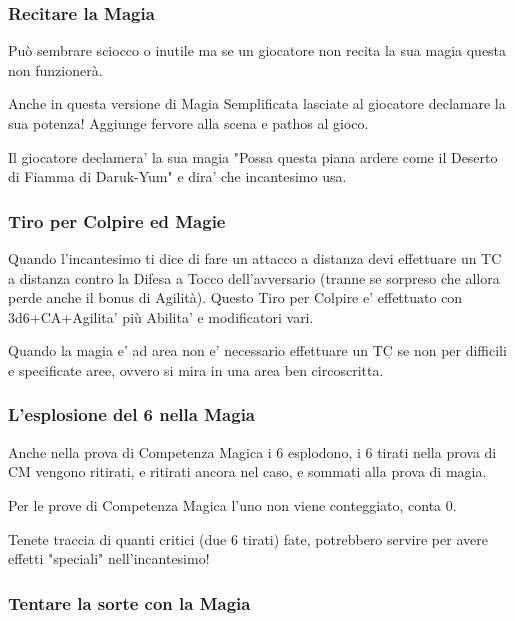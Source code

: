 \begin{multicols}{2}
\subsubsection{Recitare la Magia}

Può sembrare sciocco o inutile ma se un giocatore non recita la sua magia questa non funzionerà.

Anche in questa versione di Magia Semplificata lasciate al giocatore declamare la sua potenza!
Aggiunge fervore alla scena e pathos al gioco.

Il giocatore declamera' la sua magia "Possa questa piana ardere come il Deserto di Fiamma di Daruk-Yum" e dira' che incantesimo usa.

\subsubsection{Tiro per Colpire ed Magie}

Quando l'incantesimo ti dice di fare un attacco a distanza devi effettuare un TC a distanza contro la Difesa a Tocco dell'avversario (tranne se sorpreso che allora perde anche il bonus di Agilità). Questo Tiro per Colpire e' effettuato con 3d6+CA+Agilita' più Abilita' e modificatori vari.

Quando la magia e' ad area non e' necessario effettuare un TC se non per difficili e specificate aree, ovvero si mira in una area ben circoscritta.

\subsubsection{L'esplosione del 6 nella Magia}

\label{lesplosione-del-6-nella-magia}

Anche nella prova di Competenza Magica i 6 esplodono, i 6 tirati nella prova di CM vengono ritirati, e ritirati ancora nel caso, e sommati alla prova di magia.

Per le prove di Competenza Magica l'uno non viene conteggiato, conta 0.

Tenete traccia di quanti critici (due 6 tirati) fate, potrebbero servire per avere effetti "speciali" nell'incantesimo!

\subsubsection{Tentare la sorte con la Magia}


\end{multicols}
